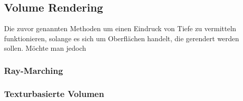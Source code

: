 \newpage
\subsection{Volume Rendering}

Die zuvor genannten Methoden um einen Eindruck von Tiefe zu vermitteln funktionieren, solange es sich um Oberflächen handelt, 
die gerendert werden sollen. Möchte man jedoch 
\subsubsection{Ray-Marching}
\subsubsection{Texturbasierte Volumen}
